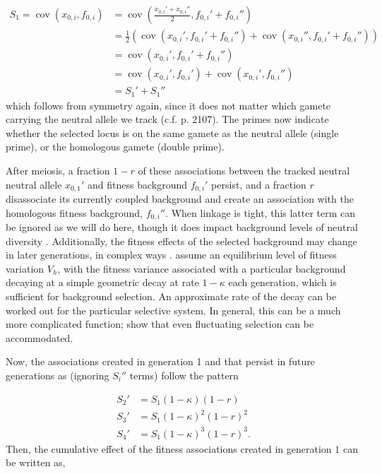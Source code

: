 \documentclass[11pt]{article}
\DeclareMathOperator{\cov}{cov}
\begin{document}
\begin{align}
  S_1 = \cov(x_{0,i}, f_{0,i}) &= \cov\left(\frac{x_{0,i}' + x_{0,i}''}{2}, f_{0,i}' + f_{0,i}''\right) \nonumber \\
                               &= \frac{1}{2}\left(\cov(x_{0,i}', f_{0,i}' + f_{0,i}'') + \cov(x_{0,i}'', f_{0,i}' + f_{0,i}'')\right) \nonumber  \\
                               &= \cov(x_{0,i}', f_{0,i}' + f_{0,i}'') \nonumber \\
                               &= \cov(x_{0,i}', f_{0,i}') + \cov(x_{0,i}', f_{0,i}'') \nonumber \\
                               &= S_1' + S_1''
\end{align}
%
which follows from symmetry again, since it does not matter which gamete
carrying the neutral allele we track (c.f. \cite{Santiago1998-bs} p. 2107). The
primes now indicate whether the selected locus is on the same gamete as the
neutral allele (single prime), or the homologous gamete (double prime).

After meiosis, a fraction $1-r$ of these associations between the tracked
neutral neutral allele $x_{0,1}'$ and fitness background $f_{0,i}'$ persist,
and a fraction $r$ disassociate its currently coupled background and create an
association with the homologous fitness background, $f_{0,i}''$. When linkage
is tight, this latter term can be ignored as we will do here, though it does
impact background levels of neutral diversity \parencite{Santiago1995-hx}.
Additionally, the fitness effects of the selected background may change in
later generations, in complex ways \parencite{Barton1986-yh,Turelli1990-kd}.
\textcite{Santiago1995-hx} assume an equilibrium level of fitness variation
$V_h$, with the fitness variance associated with a particular background
decaying at a simple geometric decay at rate $1-\kappa$ each generation, which
is sufficient for background selection. An approximate rate of the decay can be
worked out for the particular selective system. In general, this can be a much
more complicated function; \textcite{Buffalo2019-qs} show that even fluctuating
selection can be accommodated.

Now, the associations created in generation 1 and that persist in future
generations as (ignoring $S_i''$ terms) follow the pattern

\begin{align}
  S_{2}' &= S_1 (1-\kappa)(1-r) \nonumber \\
  S_{3}' &= S_1 (1-\kappa)^2(1-r)^2 \nonumber \\
  S_{4}' &= S_1 (1-\kappa)^3(1-r)^3.
\end{align}
%
Then, the cumulative effect of the fitness associations created in generation
$1$ can be written as,
\end{document}
